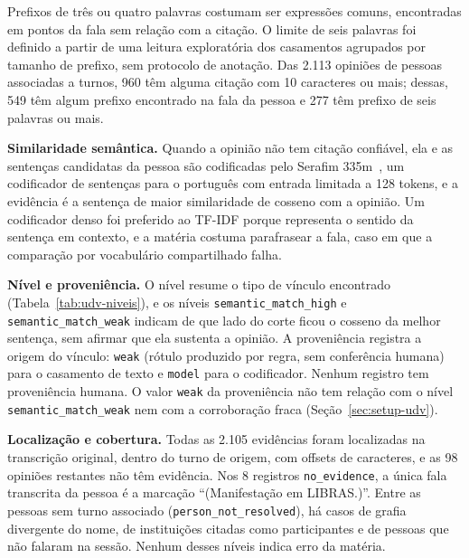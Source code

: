Prefixos de três ou quatro palavras costumam ser expressões comuns, encontradas em pontos da fala sem
relação com a citação. O limite de seis palavras foi definido a partir de uma leitura exploratória
dos casamentos agrupados por tamanho de prefixo, sem protocolo de anotação. Das 2.113 opiniões de
pessoas associadas a turnos, 960 têm alguma citação com 10 caracteres ou mais; dessas, 549 têm algum
prefixo encontrado na fala da pessoa e 277 têm prefixo de seis palavras ou mais.

\textbf{Similaridade semântica.} Quando a opinião não tem citação confiável, ela e as sentenças
candidatas da pessoa são codificadas pelo Serafim 335m~\citep{gomes2024serafim}, um codificador de
sentenças para o português com entrada limitada a 128 tokens, e a evidência é a sentença de maior
similaridade de cosseno com a opinião. Um codificador denso foi preferido ao TF-IDF porque representa o sentido da sentença em
contexto, e a matéria costuma parafrasear a fala, caso em que a comparação por vocabulário
compartilhado falha.

\textbf{Nível e proveniência.} O nível resume o tipo de vínculo encontrado
(Tabela~\ref{tab:udv-niveis}), e os níveis \texttt{semantic\_match\_high} e
\texttt{semantic\_match\_weak} indicam de que lado do corte ficou o cosseno da melhor sentença, sem
afirmar que ela sustenta a opinião. A proveniência registra a origem do vínculo: \texttt{weak}
(rótulo produzido por regra, sem conferência humana) para o casamento de texto e \texttt{model} para
o codificador. Nenhum registro tem proveniência humana. O valor \texttt{weak} da proveniência não tem
relação com o nível \texttt{semantic\_match\_weak} nem com a corroboração fraca
(Seção~\ref{sec:setup-udv}).

\textbf{Localização e cobertura.} Todas as 2.105 evidências foram localizadas na transcrição
original, dentro do turno de origem, com offsets de caracteres, e as 98 opiniões restantes não têm
evidência. Nos 8 registros \texttt{no\_evidence}, a única fala transcrita da pessoa é a marcação
``(Manifestação em LIBRAS.)''. Entre as pessoas sem turno associado (\texttt{person\_not\_resolved}),
há casos de grafia divergente do nome, de instituições citadas como participantes e de pessoas que
não falaram na sessão. Nenhum desses níveis indica erro da matéria.



